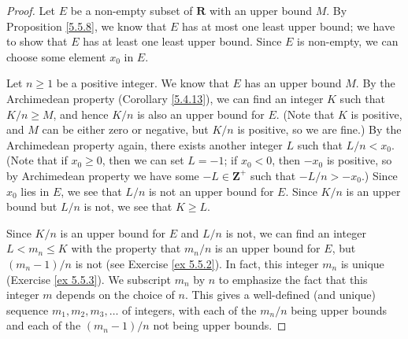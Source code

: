 \begin{proof}
    Let \(E\) be a non-empty subset of \(\mathbf{R}\) with an upper bound \(M\).
    By Proposition \ref{5.5.8}, we know that \(E\) has at most one least upper bound;
    we have to show that \(E\) has at least one least upper bound.
    Since \(E\) is non-empty, we can choose some element \(x_0\) in \(E\).

    Let \(n \geq 1\) be a positive integer.
    We know that \(E\) has an upper bound \(M\).
    By the Archimedean property (Corollary \ref{5.4.13}), we can find an integer \(K\) such that \(K / n \geq M\), and hence \(K / n\) is also an upper bound for \(E\).
    (Note that \(K\) is positive, and \(M\) can be either zero or negative, but \(K / n\) is positive, so we are fine.)
    By the Archimedean property again, there exists another integer \(L\) such that \(L / n < x_0\).
    (Note that if \(x_0 \geq 0\), then we can set \(L = -1\); if \(x_0 < 0\), then \(-x_0\) is positive, so by Archimedean property we have some \(-L \in \mathbf{Z}^+\) such that \(-L / n > -x_0\).)
    Since \(x_0\) lies in \(E\), we see that \(L / n\) is not an upper bound for \(E\).
    Since \(K / n\) is an upper bound but \(L / n\) is not, we see that \(K \geq L\).

    Since \(K / n\) is an upper bound for \(E\) and \(L / n\) is not, we can find an integer \(L < m_n \leq K\) with the property that \(m_n / n\) is an upper bound for \(E\), but \((m_n - 1) / n\) is not (see Exercise \ref{ex 5.5.2}).
    In fact, this integer \(m_n\) is unique (Exercise \ref{ex 5.5.3}).
    We subscript \(m_n\) by \(n\) to emphasize the fact that this integer \(m\) depends on the choice of \(n\).
    This gives a well-defined (and unique) sequence \(m_1, m_2, m_3, \dots\) of integers, with each of the \(m_n / n\) being upper bounds and each of the \((m_n - 1) / n\) not being upper bounds.


\end{proof}

